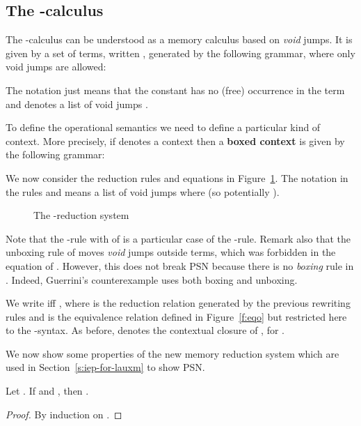 \documentclass{LMCS}
\renewcommand{\>}{\rightarrow}
\newcommand{\deft}[1]{{\bf #1}}
\begin{document}
\subsection{The -calculus}
\label{s:lauxm}

The -calculus can be understood as a memory calculus
based on \textit{void} jumps. It is given by a set of
  terms, written ,  generated by the following grammar, where only
void jumps are allowed:

The notation  just means that the constant 
has no (free) occurrence in the term  and  
denotes a list of void jumps . 

To define the operational semantics we need to define a particular
kind of context. More precisely, if  denotes a context then a
\deft{boxed context}  is given by the following grammar:

We now consider the  reduction rules
 and equations in Figure~\ref{f:laux}. 
The notation  in the rules  and 
means a list  
of void jumps where   (so
potentially ).

\begin{figure}[ht]
 
\caption{The -reduction system\label{f:lauxm}}
\label{f:laux}
\end{figure}



 \noindent Note that the -rule  with 
 of  is a particular case of the -rule.  Remark
 also that the unboxing rule of  moves \textit{void} jumps
 outside terms, which was forbidden in the equation
    of . However, this does not break PSN because 
 there is no \textit{boxing} rule in . Indeed, Guerrini's counterexample
 uses both boxing and unboxing.

We write  iff , where
 is the reduction relation generated by the previous
rewriting rules  and  is the 
equivalence relation defined in Figure~\ref{f:eqo}
but restricted here to the -syntax. As before,  denotes the contextual closure
of , for  .

We now show some properties of the new memory reduction system which are 
used in Section~\ref{s:iep-for-lauxm} to show PSN.

 
\begin{lem}
\label{l:sous-terme-substitution}
Let . If  and , then
. 
\end{lem}

\begin{proof} By induction on . 
\end{proof}
\end{document}
